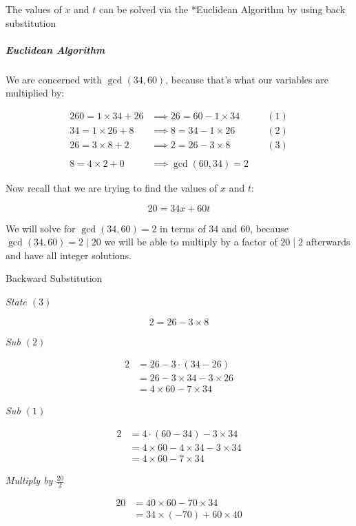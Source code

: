 \documentclass[
]{article}
\begin{document}
The values of \(x\) and \(t\) can be solved via the *Euclidean Algorithm
by using back substitution

\hypertarget{header-n577}{%
\subparagraph{Euclidean Algorithm}\label{header-n577}}

We are concerned with \(\gcd(34,60)\), because that's what our variables
are multiplied by:

\begin{alignat}{2}
60 = 1 \times 34 +26 &\implies 26 = 60-1 \times 34 \qquad &(1) \\
34 = 1\times 26 + 8 &\implies 8 = 34-1\times 26 \qquad &(2) \\
26 = 3 \times 8 + 2 & \implies 2 = 26 -3 \times 8 \qquad & (3) \\
\ \\
8 = 4\times 2 + 0 &\implies \gcd(60, 34) = 2 &
\end{alignat}

Now recall that we are trying to find the values of \(x\) and \(t\):

\[20 = 34x+60t\]

We will solve for \(\gcd(34,60) = 2\) in terms of 34 and 60, because
\(\gcd(34, 60) = 2 \mid 20\) we will be able to multiply by a factor of
\(20 \mid 2\) afterwards and have all integer solutions.

Backward Substitution

\emph{State \((3)\)}

\[2 = 26-3\times 8\]

\emph{Sub \((2)\)}

\begin{align}
2 &= 26 -3 \cdot (34-26) \\
 &= 26 -3 \times 34 -3\times 26 \\
 &= 4 \times 60 -7 \times 34
\end{align}

\emph{Sub \((1)\)}

\begin{align}
2 &= 4 \cdot (60-34)-3\times 34 \\
 &= 4 \times 60 -4 \times 34 -3 \times 34 \\
&= 4 \times 60 - 7 \times 34
\end{align}

\emph{Multiply by \(\frac{20}{2}\)}

\begin{align}
20 &= 40 \times 60 - 70\times 34 \\
 &= 34 \times (-70) + 60 \times 40
\end{align}
\end{document}
